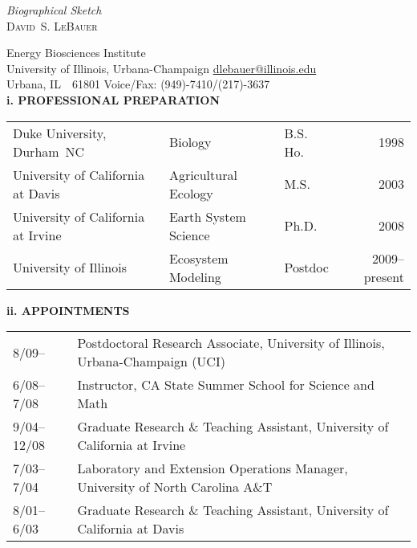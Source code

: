 \documentclass[12pt]{article}
\begin{document}
\pagestyle{myheadings}

\begin{center}
{\textit{Biographical Sketch}}\\
{\large\textsc{David~S. LeBauer}}\\
\end{center}

Energy Biosciences Institute \hfill \\
University of Illinois, Urbana-Champaign \hfill \url{dlebauer@illinois.edu}  \\
Urbana, IL~~61801 \hfill Voice/Fax: (949)-7410/(217)-3637\\

\textbf{i. PROFESSIONAL PREPARATION}
\begin{table}[h]
\begin{tabular}{ l l l r } 
Duke University, Durham~NC & Biology & B.S. Ho. & 1998 \\
University of California at Davis & Agricultural Ecology & M.S. & 2003 \\
University of California at Irvine & Earth System Science & Ph.D. & 2008\\
University of Illinois & Ecosystem Modeling & Postdoc & 2009--present\\
\end{tabular}
\end{table}

\textbf{ii. APPOINTMENTS}
\begin{table}[h]
\begin{tabular}{ l >{\raggedright}p{35.0em}<{} l }
8/09-- & Postdoctoral Research Associate, University of Illinois, Urbana-Champaign (UCI) & \\ 
6/08--7/08 & Instructor, CA State Summer School for Science and Math & \\
9/04--12/08 & Graduate Research \& Teaching Assistant, University of California at Irvine & \\ 
7/03--7/04 & Laboratory and Extension Operations Manager, University of North Carolina A\&T & \\
8/01--6/03 & Graduate Research \& Teaching Assistant, University of California at Davis & \\
\end{tabular}
\end{table}
\end{document}
